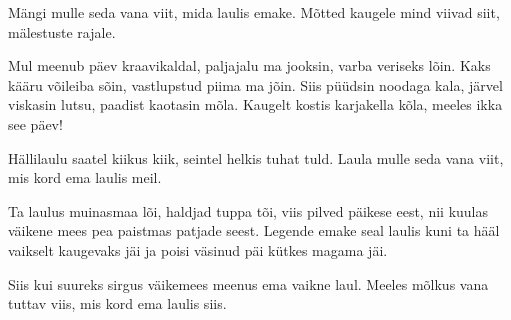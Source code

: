 M\"angi mulle seda vana viit,
mida laulis emake.
M\~otted kaugele mind viivad siit,
m\"alestuste rajale.

Mul meenub p\"aev kraavikaldal,
paljajalu ma jooksin, 
varba veriseks l\~oin.
Kaks k\"a\"aru v\~oileiba s\~oin,
vastlupstud piima ma j\~oin.
Siis p\"u\"udsin noodaga kala,
j\"arvel viskasin lutsu,
paadist kaotasin m\~ola.
Kaugelt kostis karjakella k\~ola,
meeles ikka see p\"aev!

H\"allilaulu saatel kiikus kiik,
seintel helkis tuhat tuld.
Laula mulle seda vana viit,
mis kord ema laulis meil.

Ta laulus muinasmaa l\~oi,
haldjad tuppa t\~oi, 
viis pilved p\"aikese eest,
nii kuulas v\"aikene mees
pea paistmas patjade seest.
Legende emake seal
laulis kuni ta h\"a\"al
vaikselt kaugevaks j\"ai
ja poisi v\"asinud p\"ai
k\"utkes magama j\"ai.

Siis kui suureks sirgus v\"aikemees
meenus ema vaikne laul.
Meeles m\~olkus vana tuttav viis,
mis kord ema laulis siis.